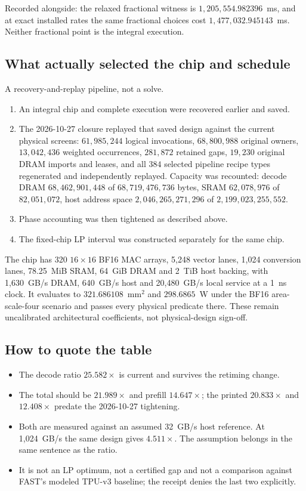 \noindent
Recorded alongside: the relaxed fractional witness is $1{,}205{,}554.982396$~ms,
and at exact installed rates the same fractional choices cost
$1{,}477{,}032.945143$~ms. Neither fractional point is the integral execution.

\subsection{What actually selected the chip and schedule}
A recovery-and-replay pipeline, not a solve.

\begin{enumerate}
\item An integral chip and complete execution were recovered earlier and saved.
\item The 2026-10-27 closure replayed that saved design against the current
physical screens: $61{,}985{,}244$ logical invocations, $68{,}800{,}988$ original
owners, $13{,}042{,}436$ weighted occurrences, $281{,}872$ retained gaps,
$19{,}230$ original DRAM imports and leases, and all $384$ selected pipeline
recipe types regenerated and independently replayed. Capacity was recounted:
decode DRAM $68{,}462{,}901{,}448$ of $68{,}719{,}476{,}736$ bytes, SRAM
$62{,}078{,}976$ of $82{,}051{,}072$, host address space
$2{,}046{,}265{,}271{,}296$ of $2{,}199{,}023{,}255{,}552$.
\item Phase accounting was then tightened as described above.
\item The fixed-chip LP interval was constructed separately for the same chip.
\end{enumerate}

\noindent
The chip has 320 $16\times16$ BF16 MAC arrays, 5,248 vector lanes, 1,024
conversion lanes, 78.25~MiB SRAM, 64~GiB DRAM and 2~TiB host backing, with
1,630~GB/s DRAM, 640~GB/s host and 20,480~GB/s local service at a 1~ns clock. It
evaluates to $321.686108$~mm$^2$ and $298.6865$~W under the BF16 area-scale-four
scenario and passes every physical predicate there. These remain uncalibrated
architectural coefficients, not physical-design sign-off.

\subsection{How to quote the table}
\begin{itemize}
\item The decode ratio $25.582\times$ is current and survives the retiming
change.
\item The total should be $21.989\times$ and prefill $14.647\times$; the printed
$20.833\times$ and $12.408\times$ predate the 2026-10-27 tightening.
\item Both are measured against an assumed 32~GB/s host reference. At
1,024~GB/s the same design gives $4.511\times$. The assumption belongs in the
same sentence as the ratio.
\item It is not an LP optimum, not a certified gap and not a comparison against
FAST's modeled TPU-v3 baseline; the receipt denies the last two explicitly.
\end{itemize}
